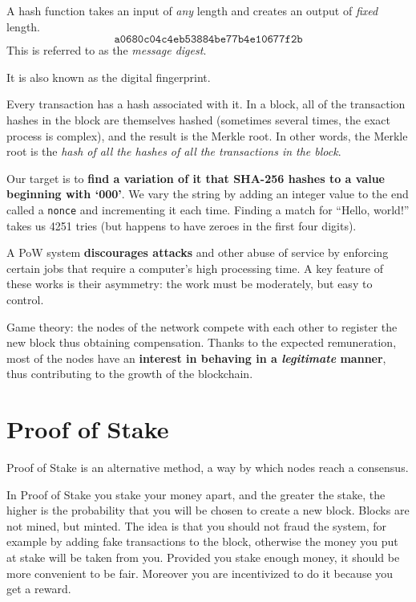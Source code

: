 A hash function takes an input of \textit{any} length and creates an output of \textit{fixed} length.
\begin{equation*}
	\texttt{a0680c04c4eb53884be77b4e10677f2b}
\end{equation*}
This is referred to as the \textit{message digest}.

It is also known as the digital fingerprint.

Every transaction has a hash associated with it. In a block, all of the transaction hashes in the block are themselves hashed (sometimes several times, the exact process is complex), and the result is the Merkle root. In other words, the Merkle root is the \textit{hash of all the hashes of all the transactions in the block}.

Our target is to \textbf{find a variation of it that SHA-256 hashes to a value beginning with `000'}. We vary the string by adding an integer value to the end called a \texttt{nonce} and incrementing it each time. Finding a match for ``Hello, world!'' takes us 4251 tries (but happens to have zeroes in the first four digits).

A PoW system \textbf{discourages attacks} and other abuse of service by enforcing certain jobs that require a computer's high processing time. A key feature of these works is their asymmetry: the work must be moderately, but easy to control.

Game theory: the nodes of the network compete with each other to register the new block thus obtaining compensation. Thanks to the expected remuneration, most of the nodes have an \textbf{interest in behaving in a \emph{legitimate} manner}, thus contributing to the growth of the blockchain.

\section{Proof of Stake}

Proof of Stake is an alternative method, a way by which nodes reach a consensus.


In Proof of Stake you stake your money apart, and the greater the stake, the higher is the probability that you will be chosen to create a new block. Blocks are not mined, but minted. The idea is that you should not fraud the system, for example by adding fake transactions to the block, otherwise the money you put at stake will be taken from you. Provided you stake enough money, it should be more convenient to be fair. Moreover you are incentivized to do it because you get a reward.

